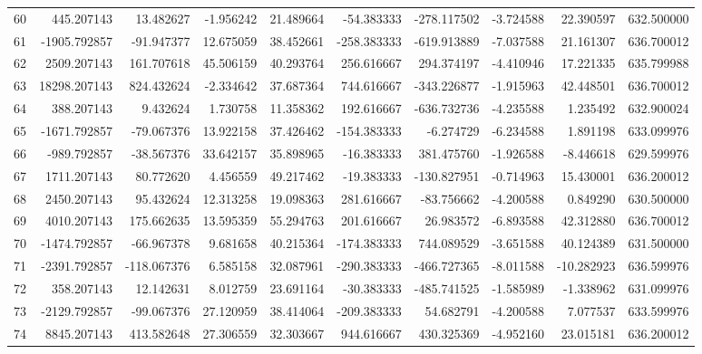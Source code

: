 \begin{tabular}{lrrrrrrrrr}
60  &    445.207143 &    13.482627 &  -1.956242 &  21.489664 &   -54.383333 &  -278.117502 &  -3.724588 &  22.390597 &  632.500000 \\
61  &  -1905.792857 &   -91.947377 &  12.675059 &  38.452661 &  -258.383333 &  -619.913889 &  -7.037588 &  21.161307 &  636.700012 \\
62  &   2509.207143 &   161.707618 &  45.506159 &  40.293764 &   256.616667 &   294.374197 &  -4.410946 &  17.221335 &  635.799988 \\
63  &  18298.207143 &   824.432624 &  -2.334642 &  37.687364 &   744.616667 &  -343.226877 &  -1.915963 &  42.448501 &  636.700012 \\
64  &    388.207143 &     9.432624 &   1.730758 &  11.358362 &   192.616667 &  -636.732736 &  -4.235588 &   1.235492 &  632.900024 \\
65  &  -1671.792857 &   -79.067376 &  13.922158 &  37.426462 &  -154.383333 &    -6.274729 &  -6.234588 &   1.891198 &  633.099976 \\
66  &   -989.792857 &   -38.567376 &  33.642157 &  35.898965 &   -16.383333 &   381.475760 &  -1.926588 &  -8.446618 &  629.599976 \\
67  &   1711.207143 &    80.772620 &   4.456559 &  49.217462 &   -19.383333 &  -130.827951 &  -0.714963 &  15.430001 &  636.200012 \\
68  &   2450.207143 &    95.432624 &  12.313258 &  19.098363 &   281.616667 &   -83.756662 &  -4.200588 &   0.849290 &  630.500000 \\
69  &   4010.207143 &   175.662635 &  13.595359 &  55.294763 &   201.616667 &    26.983572 &  -6.893588 &  42.312880 &  636.700012 \\
70  &  -1474.792857 &   -66.967378 &   9.681658 &  40.215364 &  -174.383333 &   744.089529 &  -3.651588 &  40.124389 &  631.500000 \\
71  &  -2391.792857 &  -118.067376 &   6.585158 &  32.087961 &  -290.383333 &  -466.727365 &  -8.011588 & -10.282923 &  636.599976 \\
72  &    358.207143 &    12.142631 &   8.012759 &  23.691164 &   -30.383333 &  -485.741525 &  -1.585989 &  -1.338962 &  631.099976 \\
73  &  -2129.792857 &   -99.067376 &  27.120959 &  38.414064 &  -209.383333 &    54.682791 &  -4.200588 &   7.077537 &  633.599976 \\
74  &   8845.207143 &   413.582648 &  27.306559 &  32.303667 &   944.616667 &   430.325369 &  -4.952160 &  23.015181 &  636.200012 \\

\end{tabular}
